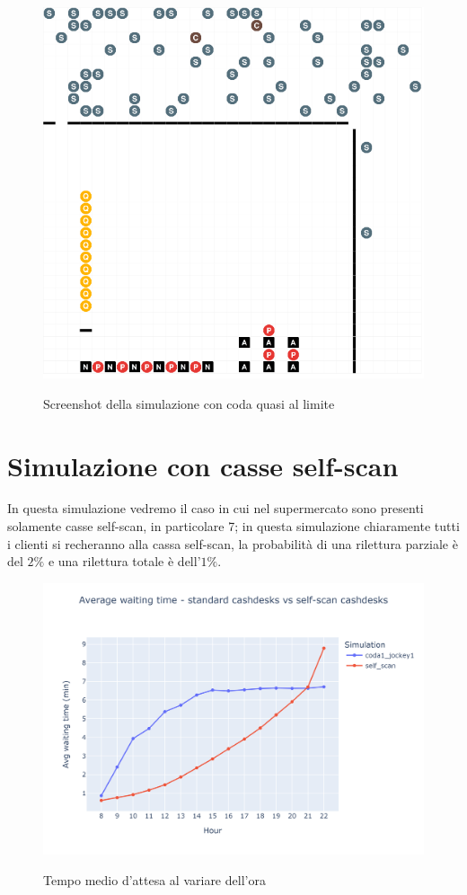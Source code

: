 \begin{figure}[H]
	\centering
	\includegraphics[width=12cm]{"images/results/codacondivisa_screenshot.png"}
	\label{fig:codacondivisa_screenshot}
	\caption{Screenshot della simulazione con coda quasi al limite}
\end{figure}

\section{Simulazione con casse self-scan}

In questa simulazione vedremo il caso in cui nel supermercato sono presenti solamente casse self-scan, in particolare 7; in questa simulazione chiaramente tutti i clienti si recheranno alla cassa self-scan, la probabilità di una rilettura parziale è del $2\%$ e una rilettura totale è dell'$1\%$.

\begin{figure}[H]
	\centering
	\includegraphics[width=12cm]{"images/results/avg_wt_selfscan.png"}
	\label{fig:avg_wt_selfscan}
	\caption{Tempo medio d'attesa al variare dell'ora}
\end{figure}

